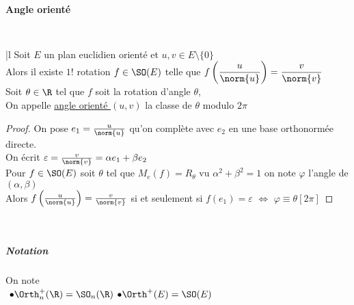 		\paragraph{Angle orienté} ${}$ \\
		\hspace*{1.5cm} \begin{minipage}{12.71cm} ${}$ \vspace*{0.15cm}\\ \hspace*{0.21cm} \begin{blockarray}{|l} 
		Soit $E$ un plan euclidien orienté et $u,v\in E\setminus\{0\}$\\
		\hspace*{0.5cm} Alors il existe $1!$ rotation $f\in\SO(E)$ telle que $f\left(\dfrac{u}{\norm{u}}\right) = \dfrac{v}{\norm{v}}$\\
		Soit $\theta\in\R$ tel que $f$ soit la rotation d'angle $\theta$,\\
		On appelle \uline{angle orienté $(u,v)$} la classe de $\theta$ modulo $2\pi$ \end{blockarray} \end{minipage} 
		\vspace*{-0.1cm} \trait 
		\vspace*{-1.4cm} \begin{proof}
		On pose $e_1= \frac{u}{\norm{u}}$ qu'on complète avec $e_2$ en une base orthonormée directe. \\On écrit $\varepsilon = \frac{v}{\norm{v}}=\alpha e_1+\beta e_2$
		\\Pour $f\in\SO(E)$ soit $\theta$ tel que $M_e(f) = R_\theta$ vu $\alpha^2+\beta^2 =1$ on note $\varphi$ l'angle de $(\alpha,\beta)$ \\
		Alors $f\left( \frac{u}{\norm{u}}\right) = \frac{v}{\norm{v}}$ si et seulement si $f(e_1)=\varepsilon$ $\Leftrightarrow$ $\varphi\equiv\theta [2\pi]$
		\end{proof}
		${}$ \\ 
		\\ \subparagraph{Notation} On note \\
		${}$ \hfill $\bullet \Orth_n^+(\R) = \SO_n(\R)$ \hfill $\bullet \Orth^+(E) = \SO(E)$ \hfill ${}$\\
